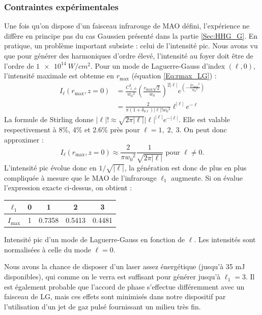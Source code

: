 \subsubsection{Contraintes expérimentales}
\label{sec:contraintes}
Une fois qu'on dispose d'un faisceau infrarouge de MAO défini, l'expérience ne diffère en principe pas du cas Gaussien présenté dans la partie \ref{Sec:HHG_G}. En pratique, un problème important subsiste : celui de l'intensité pic. Nous avons vu que pour générer des harmoniques d'ordre élevé, l'intensité au foyer doit être de l'ordre de $\SI{1e14}{W/cm^2}$. Pour un mode de Laguerre-Gauss d'index $(\ell,0)$, l'intensité maximale est obtenue en $r_\mathrm{max}$ (équation \ref{Eq:rmax_LG}) :
\begin{align*}
I_\ell(r_\mathrm{max},z=0) &= \frac{C_{\ell,0}^2}{{w_0}^2}{\left( {\frac{r_\mathrm{max}\sqrt{2}}{{w_0}}} \right)^{2\left| \ell  \right|}}{e^{\left( { - \frac{{2{{r_\mathrm{max}}^2}}}{{{{w_0}^2}}}} \right)}}\\
&= \frac{2}{\pi(1+\delta_{0\ell})\left| \ell  \right|!{w_0}^2}\ell^{\left| \ell  \right|}{e^{-\ell}}
\end{align*}
La formule de Stirling donne $\left| \ell  \right|!\approx\sqrt{2\pi\left| \ell  \right|}\left| \ell  \right|^{\left| \ell  \right|}e^{-\left| \ell  \right|}$. Elle est valable respectivement à 8\%, 4\% et 2.6\% près pour $\ell=1,\;2,\;3$. On peut donc approximer :
\begin{equation*}
I_\ell(r_\mathrm{max},z=0) \approx \frac{2}{\pi{w_0}^2}\frac{1}{\sqrt{2\pi\left| \ell  \right|}}\text{ pour }\ell\neq0. 
\end{equation*}  
L'intensité pic évolue donc en $1/\sqrt{\left| \ell  \right|}$, la génération est donc de plus en plus compliquée à mesure que le MAO de l'infrarouge $\ell_{1}$ augmente. Si on évalue l'expression exacte ci-dessus, on obtient :

\begin{center}
  \begin{tabular}{ c | c | c | c | c }
    \hline
		$\ell_{1}$ & 0 & 1 & 2 & 3 \\ \hline
    $I_{\mathrm{max}}$ & 1 & 0.7358 & 0.5413 & 0.4481 \\ \hline
  \end{tabular}
	\caption{Intensité pic d'un mode de Laguerre-Gauss en fonction de $\ell$. Les intensités sont normalisées à celle du mode $\ell = 0$.}
	\label{tab:ipeaklg}
\end{center}
Nous avons la chance de disposer d'un laser assez énergétique (jusqu'à 35 mJ disponibles), qui comme on le verra est suffisant pour générer jusqu'à $\ell_{1}=3$. Il est également probable que l'accord de phase s'effectue différemment avec un faisceau de LG, mais ces effets sont minimisés dans notre dispositif par l'utilisation d'un jet de gaz pulsé fournissant un milieu très fin.

